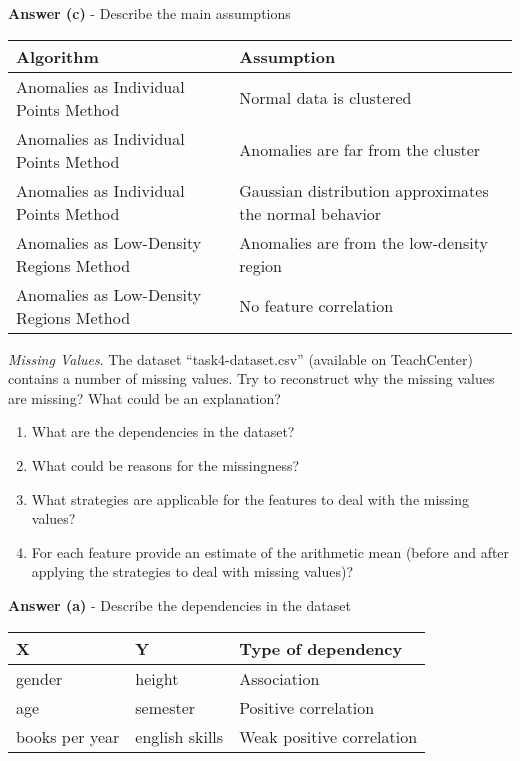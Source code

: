\documentclass[a4paper,10pt]{article}\setlength{\textheight}{10in}\setlength{\textwidth}{6.5in}\setlength{\topmargin}{-0.125in}\setlength{\oddsidemargin}{-.2in}\setlength{\evensidemargin}{-.2in}\setlength{\headsep}{0.2in}\setlength{\footskip}{0pt}\usepackage{amsmath}\usepackage{fancyhdr}\usepackage{enumitem}\usepackage{hyperref}\usepackage{xcolor}\usepackage{graphicx}\usepackage[export]{adjustbox}\usepackage{caption}\usepackage{float}\usepackage{booktabs}\usepackage{makecell}\pagestyle{fancy}
\begin{document}
\begin{enumerate}[topsep=0mm, partopsep=0mm, leftmargin=*]
\textbf{Answer (c)} - Describe the main assumptions \\
\begin{center}
\begin{tabular}{ll}
\toprule
\textbf{Algorithm} & \textbf{Assumption} \\ \midrule
Anomalies as Individual Points Method & Normal data is clustered \\
Anomalies as Individual Points Method & Anomalies are far from the cluster \\ 
Anomalies as Individual Points Method & Gaussian distribution approximates the normal behavior \\
Anomalies as Low-Density Regions Method & Anomalies are from the low-density region \\
Anomalies as Low-Density Regions Method & No feature correlation \\ 
\bottomrule
\end{tabular}
\end{center}





{\color{blue}
\clearpage\item\textit{Missing Values}. The dataset ``task4-dataset.csv'' (available on TeachCenter) contains a number of missing values. Try to reconstruct why the missing values are missing? What could be an explanation?
\begin{enumerate}
	\item What are the dependencies in the dataset?
	\item What could be reasons for the missingness?
	\item What strategies are applicable for the features to deal with the missing values?
	\item For each feature provide an estimate of the arithmetic mean (before and after applying the strategies to deal with missing values)?
\end{enumerate}
}

\textbf{Answer (a)} - Describe the dependencies in the dataset
\begin{center}
\begin{tabular}{lll}
\toprule
\textbf{X} & \textbf{Y} & \textbf{Type of dependency} \\ \midrule
gender & height & Association \\
age & semester & Positive correlation \\
books per year & english skills & Weak positive correlation \\
\bottomrule
\end{tabular}
\end{center}


\end{enumerate}
\end{document}
